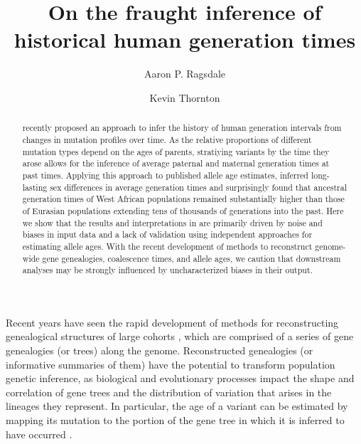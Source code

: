 \documentclass[]{article}
\begin{document}
\title{On the fraught inference of historical human generation times}
\author[1,*]{Aaron P. Ragsdale}
\author[2]{Kevin Thornton}
\maketitle

\begin{abstract}

    \noindent \citet{wang2023human} recently proposed an approach to infer the
    history of human generation intervals from changes in mutation profiles
    over time. As the relative proportions of different mutation types depend
    on the ages of parents, stratiying variants by the time they arose allows
    for the inference of average paternal and maternal generation times at past
    times. Applying this approach to published allele age estimates,
    \citet{wang2023human} inferred long-lasting sex differences in average
    generation times and surprisingly found that ancestral generation times of
    West African populations remained substantially higher than those of
    Eurasian populations extending tens of thousands of generations into the
    past. Here we show that the results and interpretations in
    \citet{wang2023human} are primarily driven by noise and biases in input
    data and a lack of validation using independent approaches for estimating
    allele ages. With the recent development of methods to reconstruct
    genome-wide gene genealogies, coalescence times, and allele ages, we
    caution that downstream analyses may be strongly influenced by
    uncharacterized biases in their output.

\end{abstract}

Recent years have seen the rapid development of methods for reconstructing
genealogical structures of large cohorts
\citep{speidel2019method,wohns2022unified,hubisz2020mapping}, which are
comprised of a series of gene genealogies (or trees) along the genome.
Reconstructed genealogies (or informative summaries of them) have the potential
to transform population genetic inference, as biological and evolutionary
processes impact the shape and correlation of gene trees and the distribution
of variation that arises in the lineages they represent. In particular, the age
of a variant can be estimated by mapping its mutation to the portion of the
gene tree in which it is inferred to have occurred \citep{albers2020dating}.
\end{document}
